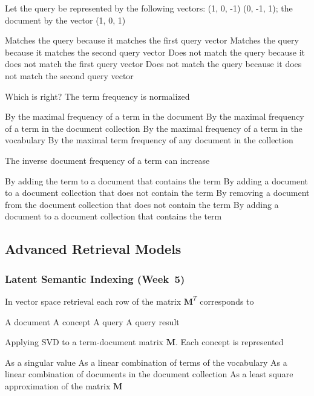 \documentclass[12pt,a4paper,answers]{exam} %
\newcommand{\mat}[1]{\ensuremath{\textbf{#1}}}
\begin{document}
\begin{flushleft}
\begin{multicols*}{2}
\begin{questions}
\question Let the query be represented by the following vectors:
(1, 0, -1) (0, -1, 1); the document by the vector (1, 0, 1)
\begin{checkboxes}
\choice Matches the query because it matches the first query vector
\CorrectChoice Matches the query because it matches the second query vector
\choice Does not match the query because it does not match the first query vector
\choice Does not match the query because it does not match the second query vector
\end{checkboxes}

\question Which is right? The term frequency is normalized
\begin{checkboxes}
\CorrectChoice By the maximal frequency of a term in the document
\choice By the maximal frequency of a term in the document collection
\choice By the maximal frequency of a term in the vocabulary
\choice By the maximal term frequency of any document in the collection
\end{checkboxes}


\question The inverse document frequency of a term can increase
\begin{checkboxes}
\choice By adding the term to a document that contains the term
\CorrectChoice By adding a document to a document collection that does not
contain the term
\choice By removing a document from the document collection that
does not contain the term
\choice By adding a document to a document collection that contains
the term
\end{checkboxes}



\subsection{Advanced Retrieval Models} %

\subsubsection{Latent Semantic Indexing (Week~5)}


\question In vector space retrieval each row of the matrix $\mat{M}^T$ corresponds to
\begin{checkboxes}
\CorrectChoice A document
\choice A concept
\choice A query
\choice A query result
\end{checkboxes}

\question Applying SVD to a term-document matrix \mat{M}. Each concept is represented
\begin{checkboxes}
\choice As a singular value
\CorrectChoice As a linear combination of terms of the vocabulary
\choice As a linear combination of documents in the document collection
\choice As a least square approximation of the matrix \mat{M}
\end{checkboxes}


\end{questions}
\end{multicols*}
\end{flushleft}
\end{document}
